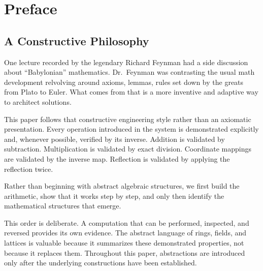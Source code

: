 \chapter*{Preface}

\section*{A Constructive Philosophy}

One lecture recorded by the legendary Richard Feynman had a side discussion about ``Babylonian'' mathematics. Dr.~Feynman was contrasting the usual math development relvolving around axioms, lemmas, rules set down by the greats from Plato to Euler. What comes from that is a more inventive and adaptive way to architect solutions.

This paper follows that constructive engineering style rather than an axiomatic presentation. Every operation introduced in the system is demonstrated explicitly and, whenever possible, verified by its inverse. Addition is validated by subtraction. Multiplication is validated by exact division. Coordinate mappings are validated by the inverse map. Reflection is validated by applying the reflection twice.

Rather than beginning with abstract algebraic structures, we first build the arithmetic, show that it works step by step, and only then identify the mathematical structures that emerge.

This order is deliberate. A computation that can be performed, inspected, and reversed provides its own evidence. The abstract language of rings, fields, and lattices is valuable because it summarizes these demonstrated properties, not because it replaces them. Throughout this paper, abstractions are introduced only after the underlying constructions have been established.
